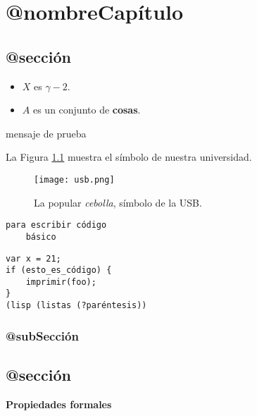 \chapter{@nombreCapítulo}
\label{capitulo1}


\section{@sección}
\begin{definition}
\label{definicion1}
\begin{itemize} 
\item $X$ es $\gamma - 2$.
\item $A$ es un conjunto de \textbf{cosas}.
\end{itemize}
\end{definition}

mensaje de prueba

La Figura \ref{usb} muestra el símbolo de nuestra universidad.
\begin{figure}[h!]
\centering
\texttt{[image: usb.png]}
\caption[La popular \textit{cebolla}]{La popular \textit{cebolla}, símbolo de la USB.}
\label{usb}
\end{figure}

\begin{verbatim}
para escribir código
    básico
\end{verbatim}

\begin{Verbatim}[commandchars=\\\{\}, codes={\catcode`$=3\catcode`^=7}]
var x = 21;
if (esto_es_código) {
    imprimir(foo);
}
(lisp (listas (?paréntesis))
\end{Verbatim}

\subsection{@subSección}

\section{@sección}

\begin{mdframed}
\begin{theorem}
\label{principal}
\textbf{Propiedades formales}
\end{theorem}
\end{mdframed}


